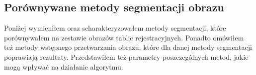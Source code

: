 \subsection{Porównywane metody segmentacji obrazu}
Poniżej wymieniłem oraz scharakteryzowałem metody segmentacji, które porównywałem na zestawie obrazów tablic rejestracyjnych. Ponadto omówiłem też metody wstępnego przetwarzania obrazu, które dla danej metody segmentacji poprawiają rezultaty. Przedstawiłem też parametry poszczególnych metod, jakie mogą wpływać na działanie algorytmu.


